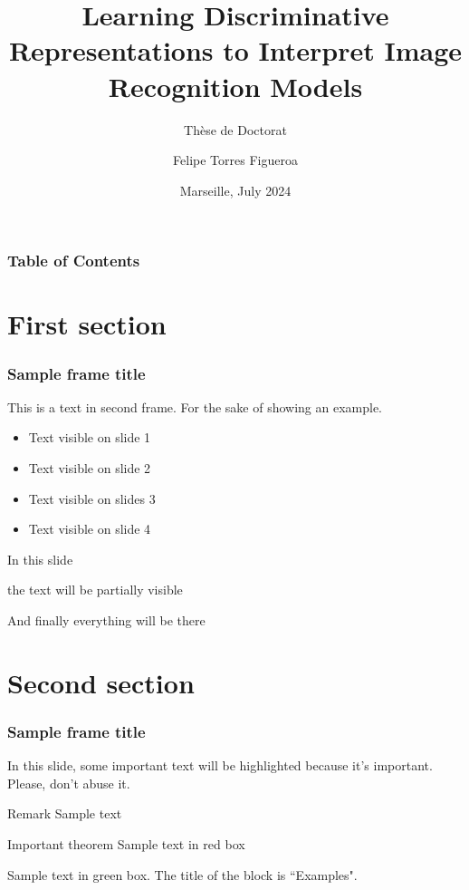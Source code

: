 \documentclass[xcolor={dvipsnames}]{beamer}
\title[Learning Discriminative Representations to Interpret Image Recognition Models] %
{Learning Discriminative Representations to Interpret Image Recognition Models}
\subtitle{Thèse de Doctorat}
\author[Felipe Torres Figueroa] %
{Felipe Torres Figueroa}
\institute[VFU] %
{
  \'Ecole Centrale de Marseille
  \and
  Aix-Marseille Universit\'e
}
\date[VLC 2021] %
{Marseille, July 2024}
\begin{document}
\frame{\titlepage}


\begin{frame}
\frametitle{Table of Contents}
\tableofcontents
\end{frame}


\section{First section}

\begin{frame}
\frametitle{Sample frame title}
This is a text in second frame. For the sake of showing an example.

\begin{itemize}
    \item<1-> Text visible on slide 1
    \item<2-> Text visible on slide 2
    \item<3> Text visible on slides 3
    \item<4-> Text visible on slide 4
\end{itemize}
\end{frame}



\begin{frame}
In this slide \pause

the text will be partially visible \pause

And finally everything will be there
\end{frame}

\section{Second section}

\begin{frame}
\frametitle{Sample frame title}

In this slide, some important text will be
\alert{highlighted} because it's important.
Please, don't abuse it.

\begin{block}{Remark}
Sample text
\end{block}

\begin{alertblock}{Important theorem}
Sample text in red box
\end{alertblock}

\begin{examples}
Sample text in green box. The title of the block is ``Examples".
\end{examples}
\end{frame}
\end{document}
